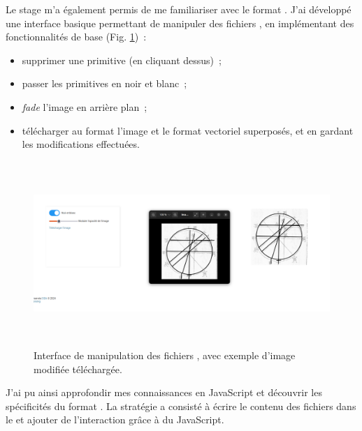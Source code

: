 Le stage m'a également permis de me familiariser avec le format \svg. J'ai développé une interface basique permettant de manipuler des fichiers \svgs, en implémentant des fonctionnalités de base (Fig. \ref{fig:manip_vecto})~: 
\begin{itemize}
    \item supprimer une primitive (en cliquant dessus)~; 
    \item passer les primitives en noir et blanc~;
    \item \textit{fade} l'image en arrière plan~;
    \item télécharger au format \jpeg l'image et le format vectoriel superposés, et en gardant les modifications effectuées.
\end{itemize}

  \begin{figure}[H]
	\begin{center}
		\includegraphics[height=7cm]{figues/manip_vecto.png}
	\end{center}
	\caption{Interface de manipulation des fichiers \svgs, avec exemple d'image modifiée téléchargée.}
	\label{fig:manip_vecto} \end{figure}

J'ai pu ainsi approfondir mes connaissances en JavaScript et découvrir les spécificités du format \svg. La stratégie a consisté à écrire le contenu des fichiers dans le \dom et ajouter de l'interaction grâce à du JavaScript. 

